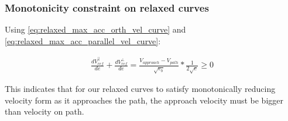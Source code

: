 \subsubsection{Monotonicity constraint on relaxed curves}
Using \autoref{eq:relaxed_max_acc_orth_vel_curve} and \autoref{eq:relaxed_max_acc_parallel_vel_curve}:

\begin{equation}
\begin{split}
    \frac{{dV}_{ref}^{\parallel}}{de} + \frac{{dV}_{ref}^{\perp}}{de} = \frac{V_{approach}-V_{path}}{\sqrt{e_b}} * \frac{1}{2\sqrt{e}} \geq 0
\end{split}
\end{equation}

This indicates that for our relaxed curves to satisfy monotonically reducing velocity form as it approaches the path, the approach velocity must be bigger than velocity on path.